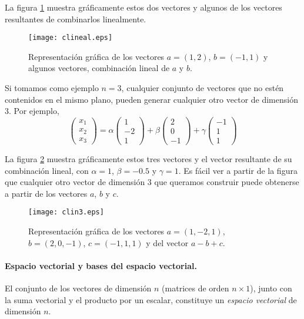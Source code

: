 La figura \ref{fig:clineal} muestra gráficamente estos dos vectores y algunos de los vectores resultantes de combinarlos linealmente.

\begin{figure}[h]
\centering
\texttt{[image: clineal.eps]}
\caption{Representación gráfica de los vectores $a=(1,2)
$, $b=(-1,1)
$ y algunos vectores, combinación lineal de $a$ y $b$.}
\label{fig:clineal}
\end{figure}
Si tomamos como ejemplo $n=3$, cualquier conjunto de vectores que no estén contenidos en el mismo plano, pueden generar cualquier otro vector de dimensión $3$. Por ejemplo,
\begin{equation*}
\begin{pmatrix}
x_1\\
x_2\\
x_3
\end{pmatrix}=\alpha \begin{pmatrix}
1\\
-2\\
1
\end{pmatrix}+ \beta \begin{pmatrix}
2\\
0\\
-1
\end{pmatrix}+ \gamma \begin{pmatrix}
-1\\
1\\
1
\end{pmatrix}
\end{equation*}

La figura \ref{fig:clin3} muestra gráficamente estos tres vectores y el vector resultante de su combinación lineal, con $\alpha=1$, $\beta=-0.5$ y $\gamma=1$.  Es fácil ver a partir de la figura que cualquier otro vector de dimensión $3$ que queramos construir puede obtenerse a partir de los vectores $a$, $b$ y $c$.
\begin{figure}[h]
\centering
\texttt{[image: clin3.eps]}
\caption{Representación gráfica de los vectores $a=(1,-2,1)
$, $b=(2,0,-1)$, $c=(-1,1,1)$ y del vector $a-b+c$.}
\label{fig:clin3}
\end{figure}

\paragraph{Espacio vectorial y  bases del espacio vectorial.} El conjunto de los vectores de dimensión $n$ (matrices de orden $n\times 1$), junto con la suma vectorial y el producto por un escalar, constituye  un  \emph{espacio vectorial} de dimensión $n$.

